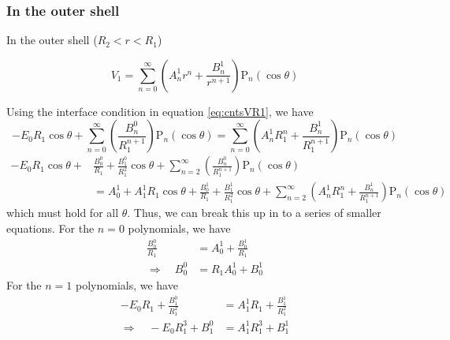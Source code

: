 \subsubsection{In the outer shell}
In the outer shell ($R_2 < r < R_1$)
\begin{mdframed}[backgroundcolor=gray!10, innertopmargin=0pt, innerbottommargin=10pt]
        \begin{equation}
    V_1
    = \sum_{n = 0}^{\infty}\left(A_n^1r^n + \frac{B_n^1}{r^{n+1}}\right)\text{P}_n(\cos\theta)
        \label{eq:V1}
    \end{equation}
\end{mdframed}
Using the interface condition in equation \ref{eq:cntsVR1}, we have
    \begin{displaymath}
        -E_0 R_1\cos\theta
        + \sum_{n = 0}^{\infty}\left(\frac{B_n^0}{R_1^{n+1}}\right)\text{P}_n(\cos\theta)
        =
        \sum_{n = 0}^{\infty}\left(A_n^1R_1^n + \frac{B_n^1}{R_1^{n+1}}\right)\text{P}_n(\cos\theta)
    \end{displaymath}
    \begin{displaymath}
        \begin{split}
            -E_0 R_1\cos\theta
            + &\frac{B_0^0}{R_1}
            + \frac{B_1^0}{R_1^{2}}\cos\theta
            +\sum_{n = 2}^{\infty}\left(\frac{B_n^0}{R_1^{n+1}}\right)\text{P}_n(\cos\theta)
            \\
            &=
            A_0^1
            + A_1^1R_1\cos\theta
            + \frac{B_0^1}{R_1}
            + \frac{B_1^1}{R_1^{2}}\cos\theta
            + \sum_{n = 2}^{\infty}\left(A_n^1R_1^n + \frac{B_n^1}{R_1^{n+1}}\right)\text{P}_n(\cos\theta)
        \end{split}
    \end{displaymath}
which must hold for all $\theta$. Thus, we can break this up in to a series of smaller equations. For the $n=0$ polynomials, we have
    \begin{equation}
        \begin{split}
        \frac{B_0^0}{R_1} &= A_0^1 + \frac{B_0^1}{R_1} \\
        \Rightarrow \quad
        B_0^0 &= R_1A_0^1 + B_0^1
        \end{split}
        \label{eq:coeff1}
    \end{equation}
For the $n=1$ polynomials, we have
    \begin{equation}
        \begin{split}
        -E_0R_1 + \frac{B_1^0}{R_1^2} &= A_1^1R_1 + \frac{B_1^1}{R_1^2} \\
        \Rightarrow \quad
        -E_0R_1^3 + B_1^0 &= A_1^1R_1^3 + B_1^1
        \end{split}
        \label{eq:coeff2}
    \end{equation}
